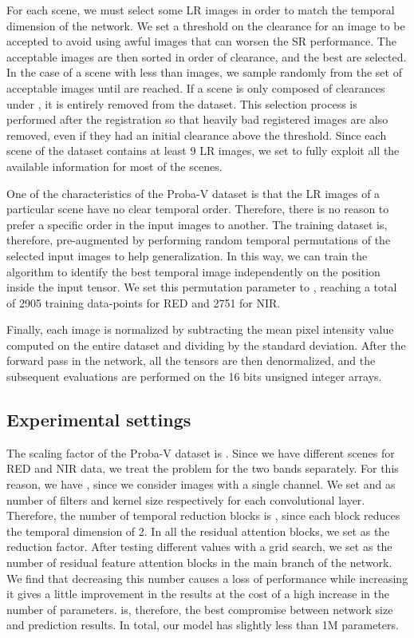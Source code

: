 \documentclass[journal]{IEEEtran}
\begin{document}
For each scene, we must select some LR images in order to match the temporal dimension  of the network. We set a threshold  on the clearance for an image to be accepted to avoid using awful images that can worsen the SR performance. The acceptable images are then sorted in order of clearance, and the best  are selected. In the case of a scene with less than  images, we sample randomly from the set of acceptable images until  are reached. If a scene is only composed of clearances under , it is entirely removed from the dataset. This selection process is performed after the registration so that heavily bad registered images are also removed, even if they had an initial clearance above the threshold. Since each scene of the dataset contains at least 9 LR images, we set  to fully exploit all the available information for most of the scenes.

One of the characteristics of the Proba-V dataset is that the LR images of a particular scene have no clear temporal order. Therefore, there is no reason to prefer a specific order in the  input images to another. The training dataset is, therefore, pre-augmented by performing  random temporal permutations of the selected  input images to help generalization. In this way, we can train the algorithm to identify the best temporal image independently on the position inside the input tensor. We set this permutation parameter to , reaching a total of 2905 training data-points for RED and 2751 for NIR.

Finally, each image is normalized by subtracting the mean pixel intensity value computed on the entire dataset and dividing by the standard deviation. After the forward pass in the network, all the tensors are then denormalized, and the subsequent evaluations are performed on the 16 bits unsigned integer arrays.

\subsection{Experimental settings}
The scaling factor of the Proba-V dataset is . Since we have different scenes for RED and NIR data, we treat the problem for the two bands separately. For this reason, we have , since we consider images with a single channel. We set  and  as number of filters and kernel size respectively for each convolutional layer. Therefore, the number of temporal reduction blocks is , since each block reduces the temporal dimension of 2. In all the residual attention blocks, we set  as the reduction factor. After testing different values with a grid search, we set  as the number of residual feature attention blocks in the main branch of the network. We find that decreasing this number causes a loss of performance while increasing it gives a little improvement in the results at the cost of a high increase in the number of parameters.  is, therefore, the best compromise between network size and prediction results. In total, our model has slightly less than 1M parameters.
\end{document}
